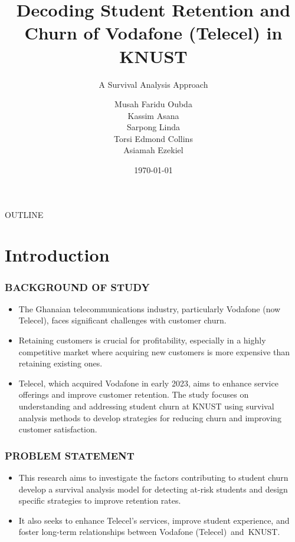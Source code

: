 \documentclass{beamer}
\title{Decoding Student Retention and Churn of Vodafone (Telecel) in KNUST}
\subtitle{A Survival Analysis Approach}
\author{Musah Faridu Oubda
	\\ Kassim Asana
	\\ Sarpong Linda
	\\ Torsi Edmond Collins
	\\ Asiamah Ezekiel}
\institute{Kwame Nkrumah University of Science and Technology}
\date{\today}
\begin{document}
	\begin{frame}
		\titlepage
	\end{frame}
	
	\begin{frame}{OUTLINE}
		\tableofcontents
	\end{frame}
	
	
	\section{Introduction}
	
	\begin{frame}
		\frametitle{BACKGROUND OF STUDY}
		\begin{itemize}
			
			
			\item 	The Ghanaian telecommunications industry, particularly Vodafone (now Telecel), faces significant challenges with customer churn. 
   \item Retaining customers is crucial for profitability, especially in a highly competitive market where acquiring new customers is more expensive than retaining existing ones.

			\item 	Telecel, which acquired Vodafone in early 2023, aims to enhance service offerings and improve customer retention. The study focuses on understanding and addressing student churn at KNUST using survival analysis methods to develop strategies for reducing churn and improving customer satisfaction.
			
		\end{itemize}
	\end{frame}
	
	\begin{frame}
		\frametitle{PROBLEM STATEMENT}
		\begin{itemize}
			\item This research aims to investigate the factors contributing to student churn develop a survival analysis model for detecting at-risk students and design specific strategies to improve retention rates. 

			\item It also seeks to enhance Telecel’s services, improve student experience, and foster long-term relationships between Vodafone (Telecel) and KNUST.
			
			
		\end{itemize}
	\end{frame}
	
\end{document}
